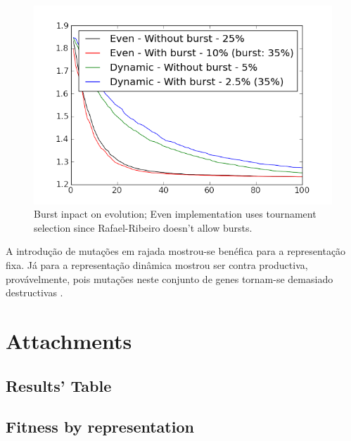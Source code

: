 \documentclass[a4paper]{article}
\begin{document}
\begin{figure}[ht]
	\centering
	\includegraphics[scale=1]{images/burst.png}
	\caption{Burst inpact on evolution; Even implementation uses tournament selection since Rafael-Ribeiro doesn't allow bursts.}
	\label{fig:gui}
\end{figure}

\indent A introdução de mutações em rajada mostrou-se benéfica para a representação fixa. Já para a representação
dinâmica mostrou ser contra productiva, provávelmente, pois mutações neste conjunto de genes tornam-se demasiado destructivas .

\cleardoublepage

\eject \pdfpagewidth=594.0mm \pdfpageheight=420.0mm
\paperwidth=594.0mm
\paperheight=420.0mm

\section{Attachments}

\subsection{Results' Table}
\label{sec:results}
\begin{center}
	
\end{center}

\eject \pdfpagewidth=210.0mm \pdfpageheight=297.0mm

\subsection{Fitness by representation}
\label{sec:fitness_by_representation}

\end{document}
